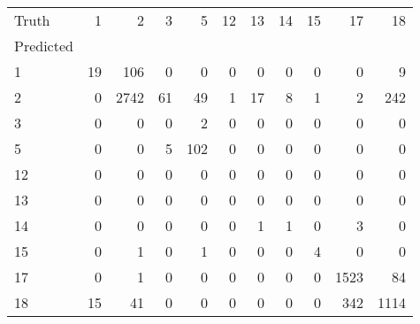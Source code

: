 \begin{tabular}{lrrrrrrrrrr}
\toprule
Truth & 1 & 2 & 3 & 5 & 12 & 13 & 14 & 15 & 17 & 18 \\
Predicted &  &  &  &  &  &  &  &  &  &  \\
\midrule
1 & 19 & 106 & 0 & 0 & 0 & 0 & 0 & 0 & 0 & 9 \\
2 & 0 & 2742 & 61 & 49 & 1 & 17 & 8 & 1 & 2 & 242 \\
3 & 0 & 0 & 0 & 2 & 0 & 0 & 0 & 0 & 0 & 0 \\
5 & 0 & 0 & 5 & 102 & 0 & 0 & 0 & 0 & 0 & 0 \\
12 & 0 & 0 & 0 & 0 & 0 & 0 & 0 & 0 & 0 & 0 \\
13 & 0 & 0 & 0 & 0 & 0 & 0 & 0 & 0 & 0 & 0 \\
14 & 0 & 0 & 0 & 0 & 0 & 1 & 1 & 0 & 3 & 0 \\
15 & 0 & 1 & 0 & 1 & 0 & 0 & 0 & 4 & 0 & 0 \\
17 & 0 & 1 & 0 & 0 & 0 & 0 & 0 & 0 & 1523 & 84 \\
18 & 15 & 41 & 0 & 0 & 0 & 0 & 0 & 0 & 342 & 1114 \\
\bottomrule
\end{tabular}
